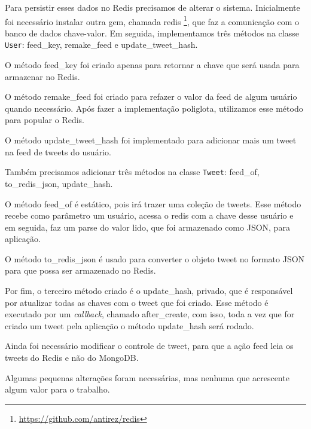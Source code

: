 Para persistir esses dados no \ac{Redis} precisamos de alterar o sistema. Inicialmente foi necessário instalar outra gem, chamada redis \footnote{\url{https://github.com/antirez/redis}}, que faz a comunicação com o banco de dados chave-valor. Em seguida, implementamos três métodos na classe \verb|User|: feed\_key, remake\_feed e update\_tweet\_hash.

O método feed\_key foi criado apenas para retornar a chave que será usada para armazenar no \ac{Redis}.

O método remake\_feed foi criado para refazer o valor da feed de algum usuário quando necessário. Após fazer a implementação poliglota, utilizamos esse método para popular o \ac{Redis}.

O método update\_tweet\_hash foi implementado para adicionar mais um tweet na feed de tweets do usuário.

Também precisamos adicionar três métodos na classe \verb|Tweet|: feed\_of, to\_redis\_json, update\_hash.

O método feed\_of é estático, pois irá trazer uma coleção de tweets. Esse método recebe como parâmetro um usuário, acessa o redis com a chave desse usuário e em seguida, faz um parse do valor lido, que foi armazenado como JSON, para aplicação.

O método to\_redis\_json é usado para converter o objeto tweet no formato JSON para que possa ser armazenado no \ac{Redis}.

Por fim, o terceiro método criado é o update\_hash, privado, que é responsável por atualizar todas as chaves com o tweet que foi criado. Esse método é executado por um \textit{callback}, chamado after\_create, com isso, toda a vez que for criado um tweet pela aplicação o método update\_hash será rodado.

Ainda foi necessário modificar o controle de tweet, para que a ação feed leia os tweets do \ac{Redis} e não do MongoDB.

Algumas pequenas alterações foram necessárias, mas nenhuma que acrescente algum valor para o trabalho.






